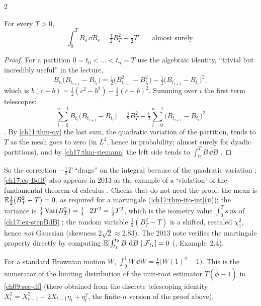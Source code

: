 \begin{paracol}{2}
\begin{theorem}\label{ch17:thm-BdB}
For every $T>0$,
\begin{equation}\label{ch17:eq-BdB}
  \int_0^TB_s\,\dd B_s=\tfrac12B_T^2-\tfrac12T\qquad\text{almost surely.}
\end{equation}
\end{theorem}
\begin{proof}
For a partition $0=t_0<\dots<t_n=T$ use the algebraic identity, ``trivial but incredibly useful'' in the lecture,
\[
  B_{t_i}\bigl(B_{t_{i+1}}-B_{t_i}\bigr)=\tfrac12\bigl(B_{t_{i+1}}^2-B_{t_i}^2\bigr)-\tfrac12\bigl(B_{t_{i+1}}-B_{t_i}\bigr)^2 ,
\]
which is $b(c-b)=\tfrac12(c^2-b^2)-\tfrac12(c-b)^2$. Summing over $i$ the first term telescopes:
\[
  \sum_{i=0}^{n-1}B_{t_i}\bigl(B_{t_{i+1}}-B_{t_i}\bigr)=\tfrac12B_T^2-\tfrac12\sum_{i=0}^{n-1}\bigl(B_{t_{i+1}}-B_{t_i}\bigr)^2
\]
. By \cref{ch11:thm-qv} the last sum, the quadratic variation of the partition, tends to $T$ as the mesh goes to zero
(in $L^2$, hence in probability; almost surely for dyadic partitions), and by \cref{ch17:thm-riemann} the left side tends to $\int_0^TB\,\dd B$ .
\end{proof}
So the correction $-\tfrac12T$ ``drags'' on the integral because of the quadratic variation ; \eqref{ch17:eq-BdB}
also appears in 2013 as the example of a `violation' of the fundamental theorem of calculus .
Checks that do not need the proof: the mean is $\mathbb{E}\tfrac12(B_T^2-T)=0$, as required for a martingale (\cref{ch17:thm-ito-int}(ii));
the variance is $\tfrac14\operatorname{Var}(B_T^2)=\tfrac14\cdot2T^2=\tfrac12T^2$, which is the isometry value $\int_0^Ts\,\dd s$ of \cref{ch17:ex-stepBdB} ;
the random variable $\tfrac12(B_T^2-T)$ is a shifted, rescaled $\chi^2_1$, hence \emph{not} Gaussian (skewness $2\sqrt2\approx2.83$). The 2013 note verifies the martingale property directly by
computing $\mathbb{E}[\int_{t_1}^{t_2}B\,\,\mathrm{d} B\mid\mathcal F_{t_1}]=0$ (, Example~2.4).

\begin{corollary}\label{ch17:cor-df}
For a standard Brownian motion $W$, $\int_0^1W\,\dd W=\tfrac12\bigl(W(1)^2-1\bigr)$. This is the numerator of the limiting distribution of the unit-root estimator
$T(\hat\phi-1)$ in \cref{ch09:sec-df} (there obtained from the discrete telescoping identity $X_t^2=X_{t-1}^2+2X_{t-1}\eta_t+\eta_t^2$, the finite-$n$ version of the proof above).
\end{corollary}


\end{paracol}
